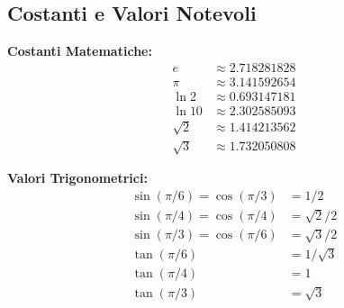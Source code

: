 \subsection{Costanti e Valori Notevoli}

\begin{info}
\textbf{Costanti Matematiche:}
\begin{align}
e &\approx 2.718281828 \\
\pi &\approx 3.141592654 \\
\ln 2 &\approx 0.693147181 \\
\ln 10 &\approx 2.302585093 \\
\sqrt{2} &\approx 1.414213562 \\
\sqrt{3} &\approx 1.732050808
\end{align}

\textbf{Valori Trigonometrici:}
\begin{align}
\sin(\pi/6) = \cos(\pi/3) &= 1/2 \\
\sin(\pi/4) = \cos(\pi/4) &= \sqrt{2}/2 \\
\sin(\pi/3) = \cos(\pi/6) &= \sqrt{3}/2 \\
\tan(\pi/6) &= 1/\sqrt{3} \\
\tan(\pi/4) &= 1 \\
\tan(\pi/3) &= \sqrt{3}
\end{align}
\end{info}
